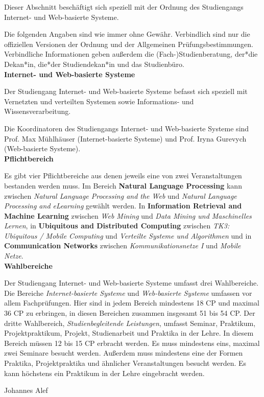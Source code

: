 {Dieser Abschnitt beschäftigt sich speziell mit der Ordnung des Studiengangs Internet- und Web-basierte Systeme.
}{
Die folgenden Angaben sind wie immer ohne Gewähr. Verbindlich sind nur die offiziellen Versionen der Ordnung und der Allgemeinen Prüfungsbestimmungen. Verbindliche Informationen geben außerdem die (Fach-)Studienberatung, der*die Dekan*in, die*der Studiendekan*in und das Studienbüro.\\

\noindent\textbf{Internet- und Web-basierte Systeme}

Der Studiengang Internet- und Web-basierte Systeme befasst sich speziell mit Vernetzten und verteilten Systemen sowie Informations- und Wissensverarbeitung.

Die Koordinatoren des Studiengangs Internet- und Web-basierte Systeme sind Prof. Max Mühlhäuser (Internet-basierte Systeme) und Prof. Iryna Gurevych (Web-basierte Systeme).\\

\noindent\textbf{Pflichtbereich}

Es gibt vier Pflichtbereiche aus denen jeweils eine von zwei Veranstaltungen bestanden werden muss. Im Bereich \textbf{Natural Language Processing} kann zwischen \textit{Natural Language Processing and the Web} und \textit{Natural Language Processing and eLearning} gewählt werden. In \textbf{Information Retrieval and Machine Learning} zwischen \textit{Web Mining} und \textit{Data Mining und Maschinelles Lernen}, in \textbf{Ubiquitous and Distributed Computing} zwischen \textit{TK3: Ubiquitous / Mobile Computing} und \textit{Verteilte Systeme und Algorithmen} und in \textbf{Communication Networks} zwischen \textit{Kommunikationsnetze I} und \textit{Mobile Netze}.\\

\noindent\textbf{Wahlbereiche}

Der Studiengang Internet- und Web-basierte Systeme umfasst drei Wahlbereiche. Die Bereiche \textit{Internet-basierte Systeme} und \textit{Web-basierte Systeme} umfassen vor allem Fachprüfungen. Hier sind in jedem Bereich mindestens 18 CP und maximal 36 CP zu erbringen, in diesen Bereichen zusammen insgesamt 51 bis 54 CP. Der dritte Wahlbereich, \textit{Studienbegleitende Leistungen}, umfasst Seminar, Praktikum, Projektpraktikum, Projekt, Studienarbeit und Praktika in der Lehre. In diesem Bereich müssen 12 bis 15 CP erbracht werden. Es muss mindestens eins, maximal zwei Seminare besucht werden. Außerdem muss mindestens eine der Formen Praktika, Projektpraktika und ähnlicher Veranstaltungen besucht werden. Es kann höchstens ein Praktikum in der Lehre eingebracht werden.\\
}
{Johannes Alef}